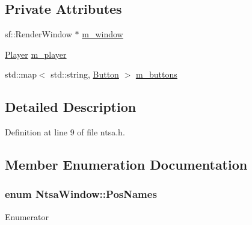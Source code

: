 \subsection*{Private Attributes}
\begin{DoxyCompactItemize}
\item 
sf\-::\-Render\-Window $\ast$ \hyperlink{class_ntsa_window_a6dec64dcc128fe25647d172cc28d7294}{m\-\_\-window}
\item 
\hyperlink{class_player}{Player} \hyperlink{class_ntsa_window_adda73a57cfa24bae0632d2b5272d0ac8}{m\-\_\-player}
\item 
std\-::map$<$ std\-::string, \hyperlink{class_button}{Button} $>$ \hyperlink{class_ntsa_window_a05f52b64bbc047c05567c22cfb58471a}{m\-\_\-buttons}
\end{DoxyCompactItemize}


\subsection{Detailed Description}


Definition at line 9 of file ntsa.\-h.



\subsection{Member Enumeration Documentation}
\hypertarget{class_ntsa_window_ad45cc5b45dd664a1dd979041e8ab17a3}{
\subsubsection[{Pos\-Names}]{\setlength{\rightskip}{0pt plus 5cm}enum {\bf Ntsa\-Window\-::\-Pos\-Names}}}\label{class_ntsa_window_ad45cc5b45dd664a1dd979041e8ab17a3}
\begin{Desc}
\item[Enumerator]\par
\begin{description}
\item[{\em 
\hypertarget{class_ntsa_window_ad45cc5b45dd664a1dd979041e8ab17a3a5959f03de015e8a12c91109a7ccd8ce2}{X}\label{class_ntsa_window_ad45cc5b45dd664a1dd979041e8ab17a3a5959f03de015e8a12c91109a7ccd8ce2}
}]\item[{\em 
\hypertarget{class_ntsa_window_ad45cc5b45dd664a1dd979041e8ab17a3ac63a6cdc64f8ce6c25e59baf4b53019f}{Y}\label{class_ntsa_window_ad45cc5b45dd664a1dd979041e8ab17a3ac63a6cdc64f8ce6c25e59baf4b53019f}
}]\end{description}
\end{Desc}


